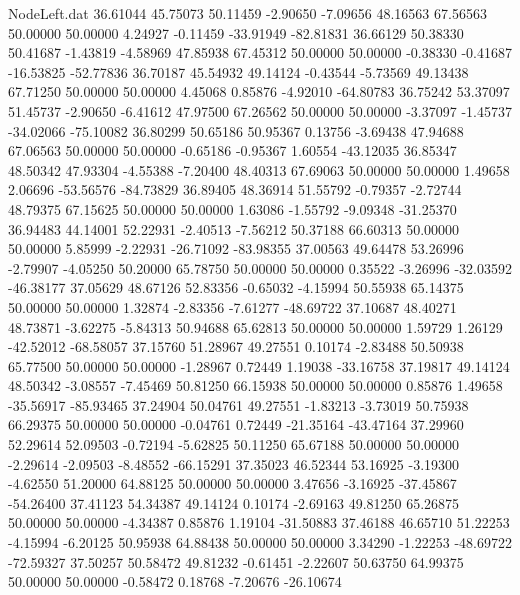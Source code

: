 \begin{filecontents}{NodeLeft.dat}
  36.61044   45.75073   50.11459    -2.90650   -7.09656   48.16563   67.56563   50.00000   50.00000    4.24927   -0.11459  -33.91949  -82.81831
  36.66129   50.38330   50.41687    -1.43819   -4.58969   47.85938   67.45312   50.00000   50.00000   -0.38330   -0.41687  -16.53825  -52.77836
  36.70187   45.54932   49.14124    -0.43544   -5.73569   49.13438   67.71250   50.00000   50.00000    4.45068    0.85876   -4.92010  -64.80783
  36.75242   53.37097   51.45737    -2.90650   -6.41612   47.97500   67.26562   50.00000   50.00000   -3.37097   -1.45737  -34.02066  -75.10082
  36.80299   50.65186   50.95367     0.13756   -3.69438   47.94688   67.06563   50.00000   50.00000   -0.65186   -0.95367    1.60554  -43.12035
  36.85347   48.50342   47.93304    -4.55388   -7.20400   48.40313   67.69063   50.00000   50.00000    1.49658    2.06696  -53.56576  -84.73829
  36.89405   48.36914   51.55792    -0.79357   -2.72744   48.79375   67.15625   50.00000   50.00000    1.63086   -1.55792   -9.09348  -31.25370
  36.94483   44.14001   52.22931    -2.40513   -7.56212   50.37188   66.60313   50.00000   50.00000    5.85999   -2.22931  -26.71092  -83.98355
  37.00563   49.64478   53.26996    -2.79907   -4.05250   50.20000   65.78750   50.00000   50.00000    0.35522   -3.26996  -32.03592  -46.38177
  37.05629   48.67126   52.83356    -0.65032   -4.15994   50.55938   65.14375   50.00000   50.00000    1.32874   -2.83356   -7.61277  -48.69722
  37.10687   48.40271   48.73871    -3.62275   -5.84313   50.94688   65.62813   50.00000   50.00000    1.59729    1.26129  -42.52012  -68.58057
  37.15760   51.28967   49.27551     0.10174   -2.83488   50.50938   65.77500   50.00000   50.00000   -1.28967    0.72449    1.19038  -33.16758
  37.19817   49.14124   48.50342    -3.08557   -7.45469   50.81250   66.15938   50.00000   50.00000    0.85876    1.49658  -35.56917  -85.93465
  37.24904   50.04761   49.27551    -1.83213   -3.73019   50.75938   66.29375   50.00000   50.00000   -0.04761    0.72449  -21.35164  -43.47164
  37.29960   52.29614   52.09503    -0.72194   -5.62825   50.11250   65.67188   50.00000   50.00000   -2.29614   -2.09503   -8.48552  -66.15291
  37.35023   46.52344   53.16925    -3.19300   -4.62550   51.20000   64.88125   50.00000   50.00000    3.47656   -3.16925  -37.45867  -54.26400
  37.41123   54.34387   49.14124     0.10174   -2.69163   49.81250   65.26875   50.00000   50.00000   -4.34387    0.85876    1.19104  -31.50883
  37.46188   46.65710   51.22253    -4.15994   -6.20125   50.95938   64.88438   50.00000   50.00000    3.34290   -1.22253  -48.69722  -72.59327
  37.50257   50.58472   49.81232    -0.61451   -2.22607   50.63750   64.99375   50.00000   50.00000   -0.58472    0.18768   -7.20676  -26.10674

\end{filecontents}
